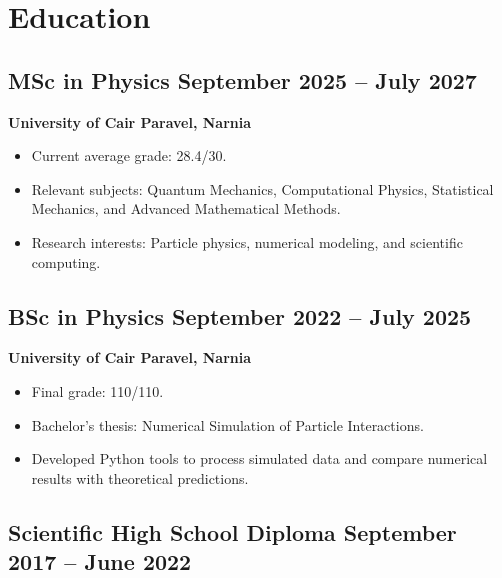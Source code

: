 \documentclass[11pt]{article}
\begin{document}
\section{
    \texorpdfstring{
    \makebox[\widthof{\faGraduationCap}][c]{
        \color{NA_Red}{\faGraduationCap}
    }\quad Education
    }
    {
    Education
    }
}


\subsection{
    \texorpdfstring{
        MSc in Physics
        \hfill September 2025 -- July 2027
    }{
        MSc in Physics -- September 2025--July 2027
    }
}

\textbf{University of Cair Paravel, Narnia}

\begin{itemize}
    \item Current average grade: 28.4/30.
    \item Relevant subjects: Quantum Mechanics, Computational Physics,
    Statistical Mechanics, and Advanced Mathematical Methods.
    \item Research interests: Particle physics, numerical modeling,
    and scientific computing.
\end{itemize}

\subsection{
    \texorpdfstring{
    BSc in Physics
    \hfill September 2022 -- July 2025
    }
    {BSc in Physics -- September 2022 -- July 2025}
}

\textbf{University of Cair Paravel, Narnia}

\begin{itemize}
    \item Final grade: 110/110.
    \item Bachelor's thesis: Numerical Simulation of Particle Interactions.
    \item Developed Python tools to process simulated data and compare
    numerical results with theoretical predictions.
\end{itemize}

\subsection{
    \texorpdfstring{
    Scientific High School Diploma
    \hfill September 2017 -- June 2022
    }
    {Scientific High School Diploma
    -- September 2017 -- June 2022}
}
\end{document}
